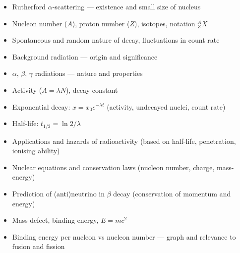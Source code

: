 \documentclass[11pt]{article}
\begin{document}
\begin{itemize}
  \item Rutherford $\alpha$-scattering --- existence and small size of nucleus
  \item Nucleon number ($A$), proton number ($Z$), isotopes, notation $^A_Z X$
  \item Spontaneous and random nature of decay, fluctuations in count rate
  \item Background radiation --- origin and significance
  \item $\alpha$, $\beta$, $\gamma$ radiations --- nature and properties
  \item Activity ($A = \lambda N$), decay constant
  \item Exponential decay: $x = x_0 e^{-\lambda t}$ (activity, undecayed nuclei, count rate)
  \item Half-life: $t_{1/2} = \ln 2/\lambda$
  \item Applications and hazards of radioactivity (based on half-life, penetration, ionising ability)
  \item Nuclear equations and conservation laws (nucleon number, charge, mass-energy)
  \item Prediction of (anti)neutrino in $\beta$ decay (conservation of momentum and energy)
  \item Mass defect, binding energy, $E = mc^2$
  \item Binding energy per nucleon vs nucleon number --- graph and relevance to fusion and fission
\end{itemize}
\end{document}
